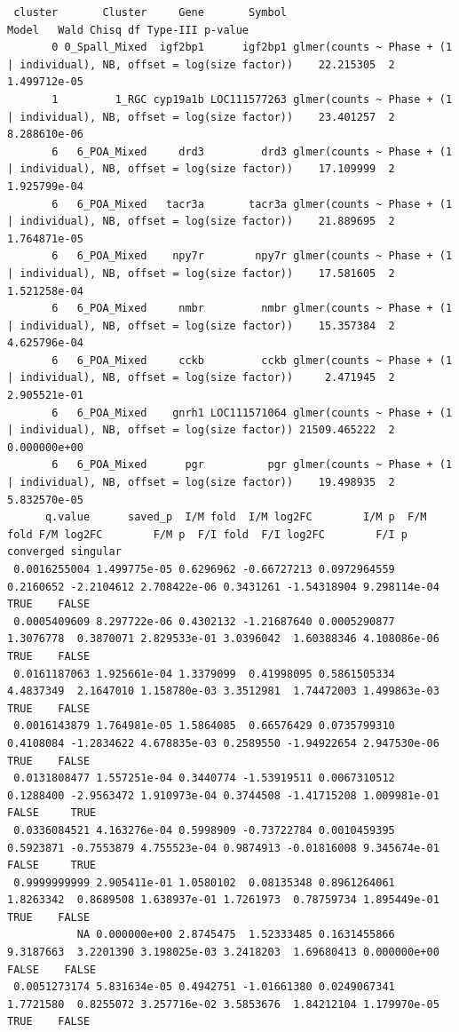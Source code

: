 \documentclass[
  landscape]{article}
\begin{document}
\begin{verbatim}
 cluster       Cluster     Gene       Symbol                                                                   Model   Wald Chisq df Type-III p-value
       0 0_Spall_Mixed  igf2bp1      igf2bp1 glmer(counts ~ Phase + (1 | individual), NB, offset = log(size factor))    22.215305  2     1.499712e-05
       1         1_RGC cyp19a1b LOC111577263 glmer(counts ~ Phase + (1 | individual), NB, offset = log(size factor))    23.401257  2     8.288610e-06
       6   6_POA_Mixed     drd3         drd3 glmer(counts ~ Phase + (1 | individual), NB, offset = log(size factor))    17.109999  2     1.925799e-04
       6   6_POA_Mixed   tacr3a       tacr3a glmer(counts ~ Phase + (1 | individual), NB, offset = log(size factor))    21.889695  2     1.764871e-05
       6   6_POA_Mixed    npy7r        npy7r glmer(counts ~ Phase + (1 | individual), NB, offset = log(size factor))    17.581605  2     1.521258e-04
       6   6_POA_Mixed     nmbr         nmbr glmer(counts ~ Phase + (1 | individual), NB, offset = log(size factor))    15.357384  2     4.625796e-04
       6   6_POA_Mixed     cckb         cckb glmer(counts ~ Phase + (1 | individual), NB, offset = log(size factor))     2.471945  2     2.905521e-01
       6   6_POA_Mixed    gnrh1 LOC111571064 glmer(counts ~ Phase + (1 | individual), NB, offset = log(size factor)) 21509.465222  2     0.000000e+00
       6   6_POA_Mixed      pgr          pgr glmer(counts ~ Phase + (1 | individual), NB, offset = log(size factor))    19.498935  2     5.832570e-05
      q.value      saved_p  I/M fold  I/M log2FC        I/M p  F/M fold F/M log2FC        F/M p  F/I fold  F/I log2FC        F/I p converged singular
 0.0016255004 1.499775e-05 0.6296962 -0.66727213 0.0972964559 0.2160652 -2.2104612 2.708422e-06 0.3431261 -1.54318904 9.298114e-04      TRUE    FALSE
 0.0005409609 8.297722e-06 0.4302132 -1.21687640 0.0005290877 1.3076778  0.3870071 2.829533e-01 3.0396042  1.60388346 4.108086e-06      TRUE    FALSE
 0.0161187063 1.925661e-04 1.3379099  0.41998095 0.5861505334 4.4837349  2.1647010 1.158780e-03 3.3512981  1.74472003 1.499863e-03      TRUE    FALSE
 0.0016143879 1.764981e-05 1.5864085  0.66576429 0.0735799310 0.4108084 -1.2834622 4.678835e-03 0.2589550 -1.94922654 2.947530e-06      TRUE    FALSE
 0.0131808477 1.557251e-04 0.3440774 -1.53919511 0.0067310512 0.1288400 -2.9563472 1.910973e-04 0.3744508 -1.41715208 1.009981e-01     FALSE     TRUE
 0.0336084521 4.163276e-04 0.5998909 -0.73722784 0.0010459395 0.5923871 -0.7553879 4.755523e-04 0.9874913 -0.01816008 9.345674e-01     FALSE     TRUE
 0.9999999999 2.905411e-01 1.0580102  0.08135348 0.8961264061 1.8263342  0.8689508 1.638937e-01 1.7261973  0.78759734 1.895449e-01      TRUE    FALSE
           NA 0.000000e+00 2.8745475  1.52333485 0.1631455866 9.3187663  3.2201390 3.198025e-03 3.2418203  1.69680413 0.000000e+00     FALSE    FALSE
 0.0051273174 5.831634e-05 0.4942751 -1.01661380 0.0249067341 1.7721580  0.8255072 3.257716e-02 3.5853676  1.84212104 1.179970e-05      TRUE    FALSE
\end{verbatim}
\end{document}
